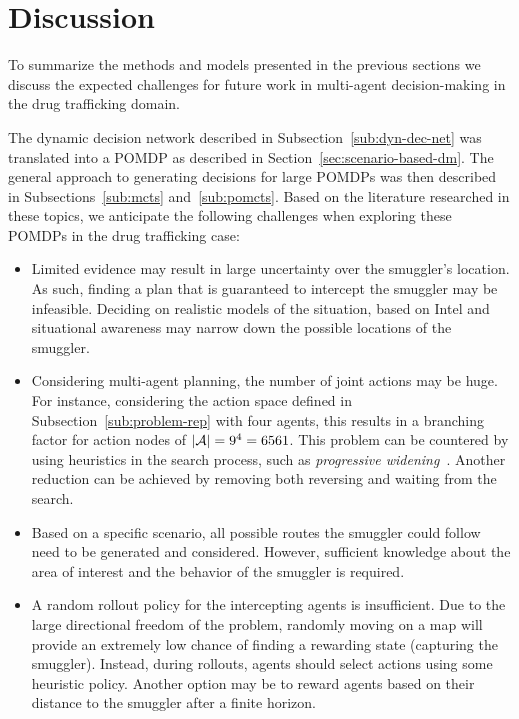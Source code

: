 \documentclass[conference]{IEEEtran}
\begin{document}
\section{Discussion}
\label{sec:discussion}

To summarize the methods and models presented in the previous sections we discuss the expected challenges for future work in multi-agent decision-making in the drug trafficking domain.

The dynamic decision network described in Subsection~\ref{sub:dyn-dec-net} was translated into a POMDP as described in Section~\ref{sec:scenario-based-dm}. The general approach to generating decisions for large POMDPs was then described in Subsections~\ref{sub:mcts} and~\ref{sub:pomcts}. Based on the literature researched in these topics, we anticipate the following challenges when exploring these POMDPs in the drug trafficking case:
\begin{itemize}
\item Limited evidence may result in large uncertainty over the smuggler's location. As such, finding a plan that is guaranteed to intercept the smuggler may be infeasible. Deciding on realistic models of the situation, based on Intel and situational awareness may narrow down the possible locations of the smuggler.
\item Considering multi-agent planning, the number of joint actions may be huge. For instance, considering the action space defined in Subsection~\ref{sub:problem-rep} with four agents, this results in a branching factor for action nodes of $\left\vert{\mathcal{A}}\right\vert=9^4=6561$. This problem can be countered by using heuristics in the search process, such as \emph{progressive widening}~\cite{chaslot2008progressive}. Another reduction can be achieved by removing both reversing \cite{realtime2014} and waiting from the search.
\item Based on a specific scenario, all possible routes the smuggler could follow need to be generated and considered. However, sufficient knowledge about the area of interest and the behavior of the smuggler is required.
\item A random rollout policy for the intercepting agents is insufficient. Due to the large directional freedom of the problem, randomly moving on a map will provide an extremely low chance of finding a rewarding state (\ie capturing the smuggler). Instead, during rollouts, agents should select actions using some heuristic policy. Another option may be to reward agents based on their distance to the smuggler after a finite horizon.
\end{itemize}
\end{document}
